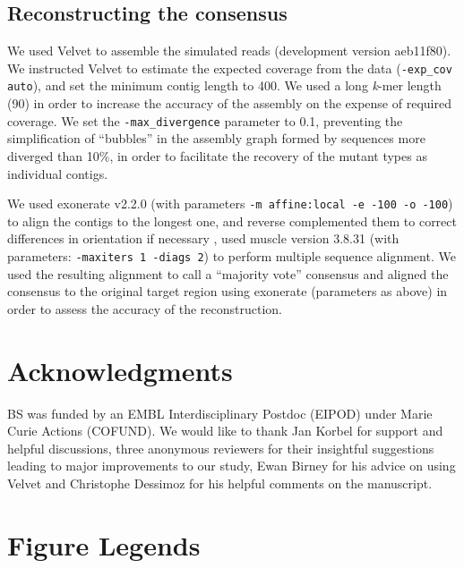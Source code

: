 \documentclass[10pt]{article}
\newcommand{\red}[1]{{\color{red} #1}}
\newcommand{\blue}[1]{{\color{blue} #1}}
\begin{document}
\subsection*{Reconstructing the consensus}

We used Velvet \cite{Zerbino2008} to assemble the simulated reads (development version aeb11f80). We instructed Velvet to estimate the expected coverage from the data ({\tt -exp\_cov auto}), and set the minimum contig length to 400. \red{We used a long \textit{k}-mer length (90) in order to increase the accuracy of the assembly on the expense of required coverage. We set the \red{{\tt -max\_divergence}} parameter to 0.1, preventing the simplification of ``bubbles'' in the assembly graph formed by sequences more diverged than 10\%, in order to facilitate the recovery of the mutant types as individual contigs.}

We used exonerate \cite{Slater2005} v2.2.0 (with parameters {\tt -m affine:local -e -100 -o -100}) to align the contigs to the longest one, and reverse complemented them to correct differences in orientation if necessary\blue{,} used muscle \cite{Edgar2004} version 3.8.31 (with parameters: {\tt -maxiters 1 -diags 2}) to perform multiple sequence alignment. We used the resulting alignment to call a ``majority vote'' consensus and aligned the consensus to the original target region using exonerate (parameters as above) in order to assess the accuracy of the reconstruction.

\section*{Acknowledgments}

BS was funded by an EMBL Interdisciplinary Postdoc (EIPOD) under Marie Curie Actions (COFUND). We would like to thank Jan Korbel for support and helpful discussions, three anonymous reviewers for their insightful suggestions leading to major improvements to our study, \blue{Ewan Birney for his advice on using Velvet} and Christophe Dessimoz for his helpful comments on the manuscript.



\section*{Figure Legends}
\end{document}
